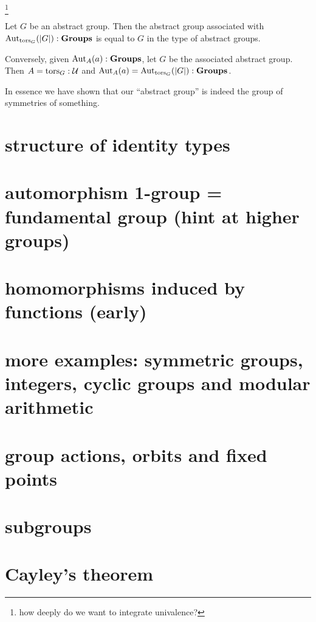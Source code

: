 \footnote{how deeply do we want to integrate univalence?}
\begin{lemma}
  \label{lem:Groupsareidentitytypes}Let $G$ be an abstract group.  Then the abstract group associated with $\mathrm{Aut}_{\mathrm{tors}_G}(|G|):\mathbf{Groups}$ is equal to $G$ in the type of abstract groups.

Conversely, given $\mathrm{Aut}_A(a):\mathbf{Groups}$, let $G$ be the associated abstract group.  Then $A=\mathrm{tors}_G:\mathcal U$ and $\mathrm{Aut}_A(a)=\mathrm{Aut}_{\mathrm{tors}_G}(|G|):\mathbf{Groups}$.
\end{lemma}
In essence we have shown that our ``abstract group'' is indeed the group of symmetries of something.

\section{structure of identity types}
\section{automorphism 1-group = fundamental group (hint at higher groups)}
\section{homomorphisms induced by functions (early)}
\section{more examples: symmetric groups, integers, cyclic groups and modular arithmetic}
\section{group actions, orbits and fixed points}
\section{subgroups}
\section{Cayley's theorem}



